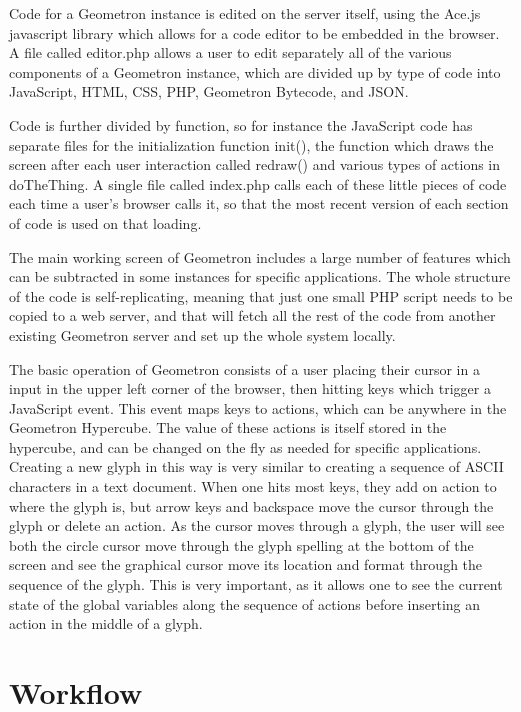 \documentclass[11pt]{article}
\begin{document}
    Code for a Geometron instance is edited on the server itself, using the Ace.js javascript library which allows for a code editor to be embedded in the browser.   A file called editor.php allows a user to edit separately all of the various components of a Geometron instance, which are divided up by type of code into JavaScript, HTML, CSS, PHP, Geometron Bytecode, and JSON.  

    Code is further divided by function, so for instance the JavaScript code has separate files for the initialization function init(), the function which draws the screen after each user interaction called redraw() and various types of actions in doTheThing.  A single file called index.php calls each of these little pieces of code each time a user's browser calls it, so that the most recent version of each section of code is used on that loading.  

    The main working screen of Geometron includes a large number of features which can be subtracted in some instances for specific applications.  The whole structure of the code is self-replicating, meaning that just one small PHP script needs to be copied to a web server, and that will fetch all the rest of the code from another existing Geometron server and set up the whole system locally.  

    The basic operation of Geometron consists of a user placing their cursor in a input in the upper left corner of the browser, then hitting keys which trigger a JavaScript event.  This event maps keys to actions, which can be anywhere in the Geometron Hypercube.  The value of these actions is itself stored in the hypercube, and can be changed on the fly as needed for specific applications.  Creating a new glyph in this way is very similar to creating a sequence of ASCII characters in a text document.  When one hits most keys, they add on action to where the glyph is, but arrow keys and backspace move the cursor through the glyph or delete an action.  As the cursor moves through a glyph, the user will see both the circle cursor move through the glyph spelling at the bottom of the screen and see the graphical cursor move its location and format through the sequence of the glyph.  This is very important, as it allows one to see the current state of the global variables along the sequence of actions before inserting an action in the middle of a glyph.  


\section{Workflow}
\end{document}
